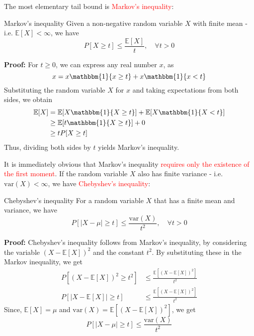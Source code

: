 \documentclass[10pt,handout,english]{beamer}
\newcommand{\E}{\mathbb{E}}
\newcommand{\1}{\mathbbm{1}}
\begin{document}
\begin{frame}[allowframebreaks]
The most elementary tail bound is \textcolor{red}{Markov's inequality}:
\begin{block}{Markov's inequality}
Given a non-negative random variable $X$ with finite mean - i.e. $\E[X]<\infty$, we have
\[
P[X\geq t]\leq\frac{\E[X]}{t},\quad \forall t>0
\]
\end{block}
\textbf{Proof:} For $t\geq 0$, we can express any real number $x$, as 
\[
x=x\1\{x\geq t\}+x\1\{x<t\}
\]
Substituting the random variable $X$ for $x$ and taking expectations from both sides, we obtain
\begin{align*}
\E[X]&=\E[X\1\{X\geq t\}]+\E[X\1\{X<t\}]\\
&\geq\E[t\1\{X\geq t\}]+0\\
&\geq tP[X\geq t]
\end{align*}
Thus, dividing both sides by $t$ yields Markov's inequality.

It is immediately obvious that Markov's inequality \textcolor{red}{requires only the existence of the first moment}. If the random variable $X$ also has finite variance - i.e. $\text{var}(X)<\infty$, we have \textcolor{red}{Chebyshev's inequality}:
\begin{block}{Chebyshev's inequality}
For a random variable $X$ that has a finite mean and variance, we have
\[
P[\lvert X-\mu \rvert\geq t]\leq\frac{\text{var}(X)}{t^2},\quad \forall t>0
\]
\end{block} 
\end{frame}
\begin{frame}[allowframebreaks]

\textbf{Proof:}
Chebyshev's inequality follows from Markov's inequality, by considering the variable $(X-\E[X])^2$ and the constant $t^2$. By substituting these in the Markov inequality, we get
\begin{align*}
P[(X-\E[X])^2\geq t^2]&\leq \frac{\E[(X-\E[X])^2]}{t^2}\\
P[\lvert X-\E[X] \rvert\geq t]&\leq\frac{\E[(X-\E[X])^2]}{t^2}
\end{align*}
Since, $\E[X]=\mu$ and $\text{var}(X)=\E[(X-\E[X])^2]$, we get
\[
P[\lvert X-\mu \rvert\geq t]\leq\frac{\text{var}(X)}{t^2}
\]
\end{frame}
\end{document}

